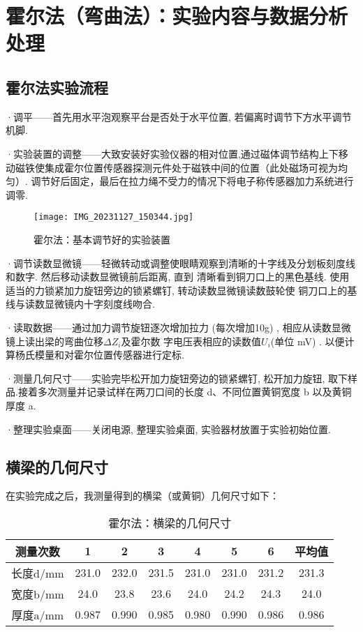 \documentclass[11pt]{article}
\begin{document}
\newpage

\section{霍尔法（弯曲法）：实验内容与数据分析处理}

\subsection{霍尔法实验流程}


·调平——首先用水平泡观察平台是否处于水平位置, 若偏离时调节下方水平调节机脚. 

·实验装置的调整——大致安装好实验仪器的相对位置,通过磁体调节结构上下移动磁铁使集成霍尔位置传感器探测元件处于磁铁中间的位置（此处磁场可视为均匀）.
调节好后固定，最后在拉力绳不受力的情况下将电子称传感器加力系统进行调零.
\begin{figure}[H]
    \centering
    \texttt{[image: IMG\_20231127\_150344.jpg]}
    \caption{霍尔法：基本调节好的实验装置}
\end{figure}

·调节读数显微镜——轻微转动或调整使眼睛观察到清晰的十字线及分划板刻度线和数字. 然后移动读数显微镜前后距离, 直到
清晰看到铜刀口上的黑色基线. 使用适当的力锁紧加力旋钮旁边的锁紧螺钉, 转动读数显微镜读数鼓轮使
铜刀口上的基线与读数显微镜内十字刻度线吻合.

·读取数据——通过加力调节旋钮逐次增加拉力 (每次增加10g) , 相应从读数显微镜上读出梁的弯曲位移$\Delta Z_i$及霍尔数
字电压表相应的读数值$U_i$(单位 mV) . 以便计算杨氏模量和对霍尔位置传感器进行定标.

·测量几何尺寸——实验完毕松开加力旋钮旁边的锁紧螺钉, 松开加力旋钮, 取下样品.接着多次测量并记录试样在两刀口间的长度 d、不同位置黄铜宽度 b 以及黄铜厚度 a.

·整理实验桌面——关闭电源, 整理实验桌面, 实验器材放置于实验初始位置.

\subsection{横梁的几何尺寸}

在实验完成之后，我测量得到的横梁（或黄铜）几何尺寸如下：
\begin{table}[H]
    \centering
    \begin{tabular}{cccccccc}
        \toprule
        测量次数 & 1 & 2 & 3 & 4 & 5 & 6 & 平均值 \\ 
        \midrule
        长度d/mm & 231.0  & 232.0  & 231.5  & 231.0  & 231.0  & 231.2  & 231.3  \\ 
        宽度b/mm & 24.0  & 23.8  & 23.6  & 24.0  & 24.2  & 24.3  & 24.0  \\ 
        厚度a/mm & 0.987  & 0.990  & 0.985  & 0.980  & 0.990  & 0.986  & 0.986 \\ 
        \bottomrule
    \end{tabular}
    \caption{霍尔法：横梁的几何尺寸}
\end{table}
\end{document}

